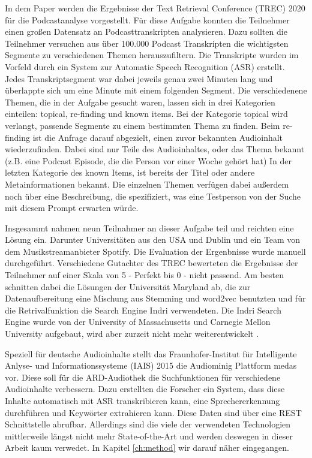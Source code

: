 In dem Paper \cite{jones2021} werden die Ergebnisse der Text Retrieval Conference (TREC) 2020 für die Podcastanalyse vorgestellt.
Für diese Aufgabe konnten die Teilnehmer einen großen Datensatz an Podcasttranskripten analysieren.
Dazu sollten die Teilnehmer versuchen aus über 100.000 Podcast Transkripten die wichtigsten Segmente zu verschiedenen Themen herauszufiltern.
Die Transkripte wurden im Vorfeld durch ein System zur Automatic Speech Recognition (ASR) erstellt.
Jedes Transkriptsegment war dabei jeweils genau zwei Minuten lang und überlappte sich um eine Minute mit einem folgenden Segment.
Die verschiedenene Themen, die in der Aufgabe gesucht waren, lassen sich in drei Kategorien einteilen: topical, re-finding und known items.
Bei der Kategorie topical wird verlangt, passende Segmente zu einem bestimmten Thema zu finden.
Beim re-finding ist die Anfrage darauf abgezielt, einen zuvor bekannten Audioinhalt wiederzufinden.
Dabei sind nur Teile des Audioinhaltes, oder das Thema bekannt (z.B. eine Podcast Episode, die die Person vor einer Woche gehört hat)
In der letzten Kategorie des known Items, ist bereits der Titel oder andere Metainformationen bekannt.
Die einzelnen Themen verfügen dabei außerdem noch über eine Beschreibung, die spezifiziert, was eine Testperson von der Suche mit diesem Prompt erwarten würde.


Insgesammt nahmen neun Teilnahmer an dieser Aufgabe teil und reichten eine Lösung ein.
Darunter Universitäten aus den USA und Dublin und ein Team von dem Musikstreamanbieter Spotify.
Die Evaluation der Ergenbnisse wurde manuell durchgeführt.
Verschiedene Gutachter des TREC bewerteten die Ergebnisse der Teilnehmer auf einer Skala von 5 - Perfekt bis 0 - nicht passend.
Am besten schnitten dabei die Lösungen der Universität Maryland ab, die zur Datenaufbereitung eine  Mischung aus Stemming und word2vec benutzten und für die Retrivalfunktion die Search Engine Indri verwendeten.
Die Indri Search Engine wurde von der University of Massachusetts und Carnegie Mellon University aufgebaut, wird aber zurzeit nicht mehr weiterentwickelt \cite{lemur}.


Speziell für deutsche Audioinhalte stellt das Fraunhofer-Institut für Intelligente Anlyse- und Informationssysteme (IAIS) 2015 die Audiominig Plattform medas vor.
Diese soll für die ARD-Audiothek die Suchfunktionen für verschiedene Audioinhalte verbessern.
Dazu erstellten die Forscher ein System, dass diese Inhalte automatisch mit ASR transkribieren kann, eine Sprechererkennung durchführen und Keywörter extrahieren kann.
Diese Daten sind über eine REST Schnittstelle abrufbar.
Allerdings sind die viele der verwendeten Technologien mittlerweile längst nicht mehr State-of-the-Art und werden deswegen in dieser Arbeit kaum verwedet.
In Kapitel \autoref{ch:method} wir darauf näher eingegangen.
\cite{maroni2020}
